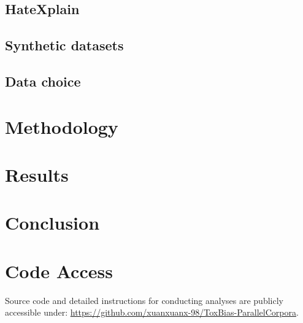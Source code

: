 \documentclass[11pt]{article}
\begin{document}
\subsection{HateXplain}















































\newpage

\subsection{Synthetic datasets}

\subsection{Data choice}

\section{Methodology}

\section{Results}

\section{Conclusion}




\newpage









\appendix

\section{Code Access}

Source code and detailed instructions for conducting analyses are publicly accessible under: \href{https://github.com/xuanxuanx-98/ToxBias-ParallelCorpora}{https://github.com/xuanxuanx-98/ToxBias-ParallelCorpora}.
\end{document}
